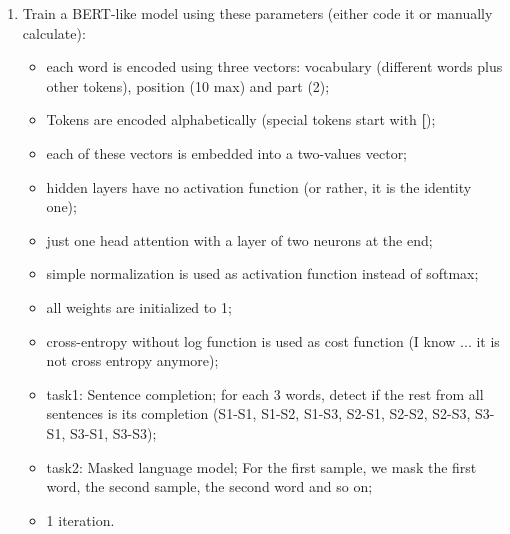 \documentclass[11pt, a4paper]{article}
\begin{document}
\begin{enumerate}
	\item Train a BERT-like model using these parameters (either code it or manually calculate):
	\begin{itemize}
		\item each word is encoded using three vectors: vocabulary (different words plus other tokens), position (10 max) and part (2);
		\item Tokens are encoded alphabetically (special tokens start with \textbf{[});
		\item each of these vectors is embedded into a two-values vector;
		\item hidden layers have no activation function (or rather, it is the identity one);
		\item just one head attention with a layer of two neurons at the end;
		\item simple normalization is used as activation function instead of softmax;
		\item all weights are initialized to 1;
		\item cross-entropy without log function is used as cost function (I know ... it is not cross entropy anymore);
		\item task1: Sentence completion; for each 3 words, detect if the rest from all sentences is its completion (S1-S1, S1-S2, S1-S3, S2-S1, S2-S2, S2-S3, S3-S1, S3-S1, S3-S3); 
		\item task2: Masked language model; For the first sample, we mask the first word, the second sample, the second word and so on;
		\item 1 iteration.
	\end{itemize}
	
\end{enumerate}
\end{document}
